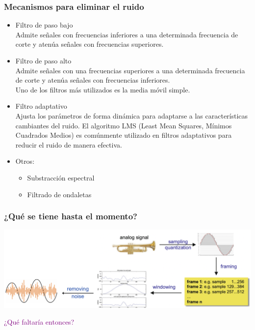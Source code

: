 \documentclass[
10pt, %
aspectratio=169, %
]{beamer}
\begin{document}
	\begin{frame}
		
		\frametitle{Mecanismos para eliminar el ruido}
		
		\begin{itemize}
			
			\item Filtro de paso bajo \\
			Admite señales con frecuencias inferiores a una determinada frecuencia de corte y atenúa señales con frecuencias superiores. 
			
			\pause
			\item Filtro de paso alto \\
			Admite señales con una frecuencias superiores a una determinada frecuencia de corte y atenúa señales con frecuencias inferiores. \\[3mm]
			
			Uno de los filtros más utilizados es la media móvil simple. \\[3mm]
			
			\pause
			\item Filtro adaptativo \\
			Ajusta los parámetros de forma dinámica para adaptarse a las características cambiantes del ruido. El algoritmo LMS (Least Mean Squares, Mínimos Cuadrados Medios) es comúnmente utilizado en filtros adaptativos para reducir el ruido de manera efectiva.
			
			\pause
			\item Otros:
			\begin{itemize}
				\item Substracción espectral
				\item Filtrado de ondaletas
			\end{itemize}
		\end{itemize}
					
	\end{frame}
	\begin{frame}
		
		\frametitle{¿Qué se tiene hasta el momento?}
		
		\centering
				
		\includegraphics[scale=0.47]{paso1-.png}
		
		\vspace{2\baselineskip}
		
		\pause
		\textcolor{purple}{¿Qué faltaría entonces?}
	
	\end{frame}
	
\end{document}
